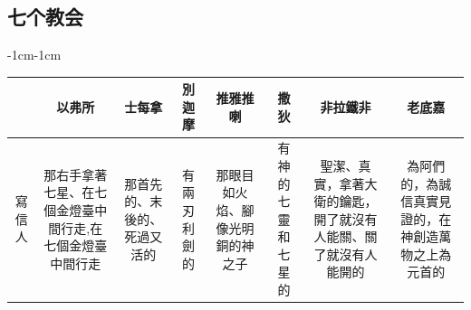 \subsection{七个教会}

\begin{changemargin}{-1cm}{-1cm}
\begin{table} %
\centering
\begin{tabular}{cccccccc}\hline
&以弗所  & 士每拿 & 別迦摩&推雅推喇 & 撒狄&非拉鐵非  & 老底嘉  \\\hline
\multicolumn{1}{m{.3cm}|}{寫信人}&
\multicolumn{1}{m{3cm}|}{那右手拿著七星、在七個金燈臺中間行走,在七個金燈臺中間行走}  &
\multicolumn{1}{m{2cm}|}{那首先的、末後的、死過又活的}  &
 \multicolumn{1}{m{3cm}|}{有兩刃利劍的} &
 \multicolumn{1}{m{4cm}|}{那眼目如火焰、腳像光明銅的神之子}  &
 \multicolumn{1}{m{3cm}|}{有神的七靈和七星的}   &
 \multicolumn{1}{m{3.6cm}|}{聖潔、真實，拿著大衛的鑰匙，開了就沒有人能關、關了就沒有人能開的}  &  
 \multicolumn{1}{m{3cm}|}{為阿們的，為誠信真實見證的，在神創造萬物之上為元首的} \\\hline
 

\end{tabular}
\end{table}
\end{changemargin}
